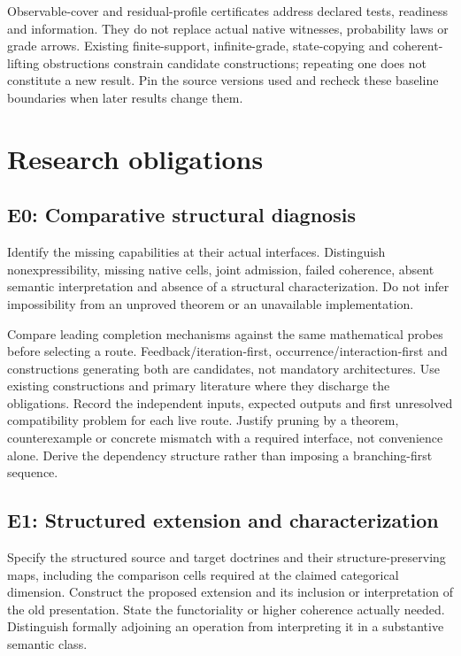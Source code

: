 \documentclass[11pt]{article}
\begin{document}
Observable-cover and residual-profile certificates address declared tests, readiness and information. They do not replace actual native witnesses, probability laws or grade arrows. Existing finite-support, infinite-grade, state-copying and coherent-lifting obstructions constrain candidate constructions; repeating one does not constitute a new result. Pin the source versions used and recheck these baseline boundaries when later results change them.

\section{Research obligations}

\subsection*{E0: Comparative structural diagnosis}
Identify the missing capabilities at their actual interfaces. Distinguish nonexpressibility, missing native cells, joint admission, failed coherence, absent semantic interpretation and absence of a structural characterization. Do not infer impossibility from an unproved theorem or an unavailable implementation.

Compare leading completion mechanisms against the same mathematical probes before selecting a route. Feedback/iteration-first, occurrence/interaction-first and constructions generating both are candidates, not mandatory architectures. Use existing constructions and primary literature where they discharge the obligations. Record the independent inputs, expected outputs and first unresolved compatibility problem for each live route. Justify pruning by a theorem, counterexample or concrete mismatch with a required interface, not convenience alone. Derive the dependency structure rather than imposing a branching-first sequence.

\subsection*{E1: Structured extension and characterization}
Specify the structured source and target doctrines and their structure-preserving maps, including the comparison cells required at the claimed categorical dimension. Construct the proposed extension and its inclusion or interpretation of the old presentation. State the functoriality or higher coherence actually needed. Distinguish formally adjoining an operation from interpreting it in a substantive semantic class.
\end{document}
